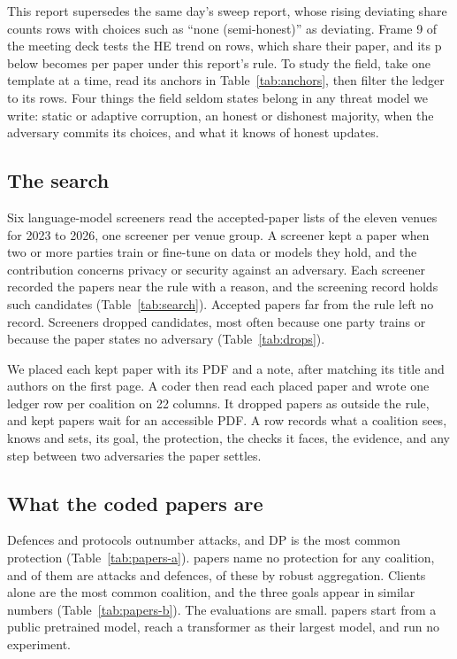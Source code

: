 \documentclass{labreport}
\newcommand{\T}[1]{}
\begin{document}
\lrchanges
This report supersedes the same day's sweep report, whose rising deviating share
counts  rows with choices such as ``none (semi-honest)'' as
deviating. Frame 9 of the meeting deck tests the HE trend on
rows, which share their paper, and its p below  becomes
 per paper under this report's rule. To study the field, take one
template at a time, read its anchors in Table~\ref{tab:anchors}, then filter the
ledger to its rows. Four things the field seldom states belong in any threat
model we write: static or adaptive corruption, an honest or dishonest majority,
when the adversary commits its choices, and what it knows of honest updates.

\lrmethod
\subsection*{The search}
Six language-model screeners read the accepted-paper lists of the eleven venues
for 2023 to 2026, one screener per venue group. A screener kept a paper when two
or more parties train or fine-tune on data or models they hold, and the
contribution concerns privacy or security against an adversary. Each screener
recorded the papers near the rule with a reason, and the screening record holds
 such candidates (Table~\ref{tab:search}). Accepted papers far
from the rule left no record. Screeners dropped  candidates,
most often because one party trains or because the paper states no adversary
(Table~\ref{tab:drops}).

We placed each kept paper with its PDF and a note, after matching its title and
authors on the first page. A coder then read each placed paper and wrote one
ledger row per coalition on 22 columns. It dropped  papers as
outside the rule, and  kept papers wait for an accessible PDF. A row
records what a coalition sees, knows and sets, its goal, the protection, the
checks it faces, the evidence, and any step between two adversaries the paper
settles.

\T{search}
\T{drops}

\subsection*{What the coded papers are}
Defences and protocols outnumber attacks, and DP is the most common protection
(Table~\ref{tab:papers-a}).  papers name no protection for
any coalition, and  of them are attacks and
 defences,  of these by robust aggregation. Clients alone are
the most common coalition, and the three goals appear in similar numbers
(Table~\ref{tab:papers-b}). The evaluations are small.  papers
start from a public pretrained model,  reach a transformer as their
largest model, and  run no experiment.
\end{document}
